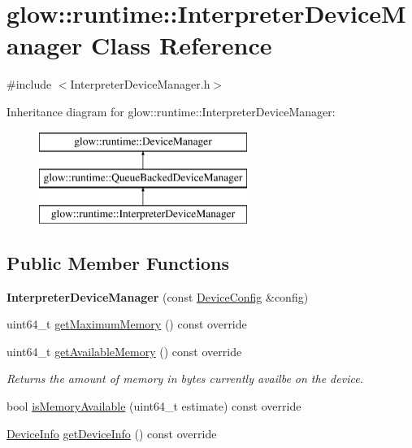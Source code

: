 \hypertarget{classglow_1_1runtime_1_1_interpreter_device_manager}{}\section{glow\+:\+:runtime\+:\+:Interpreter\+Device\+Manager Class Reference}
\label{classglow_1_1runtime_1_1_interpreter_device_manager}


{\ttfamily \#include $<$Interpreter\+Device\+Manager.\+h$>$}

Inheritance diagram for glow\+:\+:runtime\+:\+:Interpreter\+Device\+Manager\+:\begin{figure}[H]
\begin{center}
\leavevmode
\includegraphics[height=3.000000cm]{classglow_1_1runtime_1_1_interpreter_device_manager}
\end{center}
\end{figure}
\subsection*{Public Member Functions}
\begin{DoxyCompactItemize}
\item 
\mbox{\label{classglow_1_1runtime_1_1_interpreter_device_manager_a7364c982959bdfd9235d1e0c0115a2be}} 
{\bfseries Interpreter\+Device\+Manager} (const \hyperlink{structglow_1_1runtime_1_1_device_config}{Device\+Config} \&config)
\item 
uint64\+\_\+t \hyperlink{classglow_1_1runtime_1_1_interpreter_device_manager_a6b7d0747cee65050a106437a55997036}{get\+Maximum\+Memory} () const override
\item 
\mbox{\label{classglow_1_1runtime_1_1_interpreter_device_manager_aad7c95da9a3fe8627093a3ba8ad224d4}} 
uint64\+\_\+t \hyperlink{classglow_1_1runtime_1_1_interpreter_device_manager_aad7c95da9a3fe8627093a3ba8ad224d4}{get\+Available\+Memory} () const override
\begin{DoxyCompactList}\small\item\em Returns the amount of memory in bytes currently availbe on the device. \end{DoxyCompactList}\item 
bool \hyperlink{classglow_1_1runtime_1_1_interpreter_device_manager_a04615e8203b6f581e8646f631346418a}{is\+Memory\+Available} (uint64\+\_\+t estimate) const override
\item 
\hyperlink{structglow_1_1runtime_1_1_device_info}{Device\+Info} \hyperlink{classglow_1_1runtime_1_1_interpreter_device_manager_a02839dd04dcd6e6c3d768f39c666b67b}{get\+Device\+Info} () const override
\end{DoxyCompactItemize}
